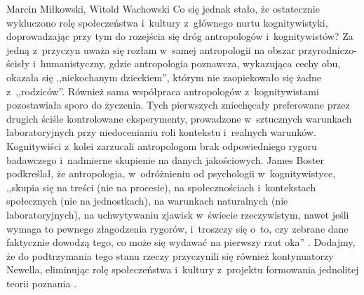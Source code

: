 \begin{artplenv2auth}{Marcin Miłkowski, Witold Wachowski}
Co się jednak stało, że ostatecznie wykluczono rolę społeczeństwa i~kultury z~głównego nurtu kognitywistyki, doprowadzając przy tym do rozejścia się dróg antropologów i~kognitywistów? Za jedną z~przyczyn uważa się rozłam w~samej antropologii na obszar przyrodniczo-ścisły i~humanistyczny, gdzie antropologia poznawcza, wykazująca cechy obu, okazała się ,,niekochanym dzieckiem'', którym nie zaopiekowało się żadne z~,,rodziców''. Również sama współpraca antropologów z~kognitywistami pozostawiała sporo do życzenia. Tych pierwszych zniechęcały preferowane przez drugich ściśle kontrolowane eksperymenty, prowadzone w~sztucznych warunkach laboratoryjnych przy niedocenianiu roli kontekstu i~realnych warunków. Kognitywiści z~kolei zarzucali antropologom brak odpowiedniego rygoru badawczego i~nadmierne skupienie na danych jakościowych. James Boster podkreślał, że antropologia, w~odróżnieniu od psychologii w~kognitywistyce, ,,skupia się na treści (nie na procesie), na społecznościach i~kontekstach społecznych (nie na jednostkach), na warunkach naturalnych (nie laboratoryjnych), na uchwytywaniu zjawisk w~świecie rzeczywistym, nawet jeśli wymaga to pewnego złagodzenia rygorów, i~troszczy się o~to, czy zebrane dane faktycznie dowodzą tego, co może się wydawać na pierwszy rzut oka''
\parencite[za ][s.~377; przekład własny]{bender_anthropology_2010}. %
 Dodajmy, że do podtrzymania tego stanu rzeczy przyczynili się również kontynuatorzy Newella, eliminując rolę społeczeństwa i~kultury z~projektu formowania jednolitej teorii poznania 
\parencites[][]{hutchins_cognition_1995}[][]{bender_anthropology_2010}[][]{anderson_newell_2003}[][]{kronenfeld_companion_2011}.%



\end{artplenv2auth}
